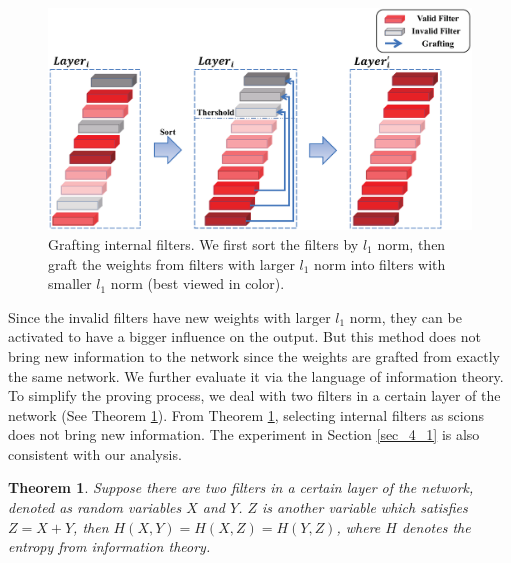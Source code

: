 \documentclass{article}
\newtheorem{theorem}{Theorem}
\begin{document}
\begin{figure}[!h]
	\centering
	\includegraphics[width=15cm]{fig/inside_grafting.eps}
	\caption{Grafting internal filters. We first sort the filters by $l_{1}$ norm, then graft the weights from filters with larger $l_{1}$ norm into filters with smaller $l_{1}$ norm (best viewed in color).}
	\label{figure: inside_grafting}
\end{figure}

Since the invalid filters have new weights with larger $l_{1}$ norm, they can be activated to have a bigger influence on the output. But this method does not bring new information to the network since the weights are grafted from exactly the same network. We further evaluate it via the language of information theory. To simplify the proving process, we deal with two filters in a certain layer of the network (See Theorem \ref{theo1}). From Theorem \ref{theo1}, selecting internal filters as scions does not bring new information. The experiment in Section \ref{sec_4_1} is also consistent with our analysis.

\begin{theorem}\label{theo1}
	Suppose there are two filters in a certain layer of the network, denoted as random variables $X$ and $Y$. $Z$ is another variable which satisfies $Z = X+Y$, then $H(X,Y) = H(X,Z) = H(Y,Z)$, where $H$ denotes the entropy from information theory.
\end{theorem}
\end{document}
